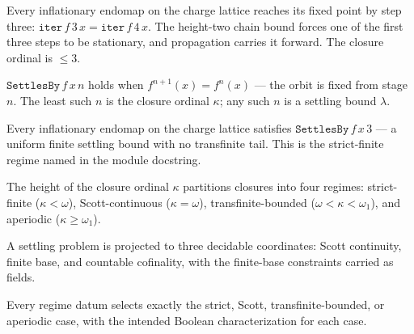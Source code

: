 \begin{theorem}[Strict-finite termination: $f^3 = f^4$]\label{thm:settles-by-three}\leanok{}
Every inflationary endomap on the charge lattice reaches its fixed point by step
three: $\texttt{iter}\,f\,3\,x = \texttt{iter}\,f\,4\,x$. The height-two chain
bound forces one of the first three steps to be stationary, and propagation
carries it forward. The closure ordinal is $\le 3$.
\end{theorem}
\begin{proposition}\label{thm:settles-by}\leanok{}
$\texttt{SettlesBy}\,f\,x\,n$ holds when $f^{n+1}(x) = f^n(x)$ --- the orbit is
fixed from stage $n$. The least such $n$ is the closure ordinal $\kappa$; any
such $n$ is a settling bound $\lambda$.
\end{proposition}
\begin{theorem}\label{thm:strict-finite}\leanok{}
Every inflationary endomap on the charge lattice satisfies
$\texttt{SettlesBy}\,f\,x\,3$ --- a uniform finite settling bound with no
transfinite tail. This is the strict-finite regime named in the module
docstring.
\end{theorem}
\begin{proposition}\label{thm:closure-regime-carrier}\leanok{}
The height of the closure ordinal $\kappa$ partitions closures into four
regimes: strict-finite ($\kappa < \omega$), Scott-continuous
($\kappa = \omega$), transfinite-bounded ($\omega < \kappa < \omega_1$), and
aperiodic ($\kappa \ge \omega_1$).
\end{proposition}
\begin{proposition}\label{thm:closure-regime-data}\leanok{}
A settling problem is projected to three decidable coordinates: Scott
continuity, finite base, and countable cofinality, with the finite-base
constraints carried as fields.
\end{proposition}
\begin{proposition}\label{thm:four-regime-dichotomy}\leanok{}
Every regime datum selects exactly the strict, Scott, transfinite-bounded, or
aperiodic case, with the intended Boolean characterization for each case.
\end{proposition}
